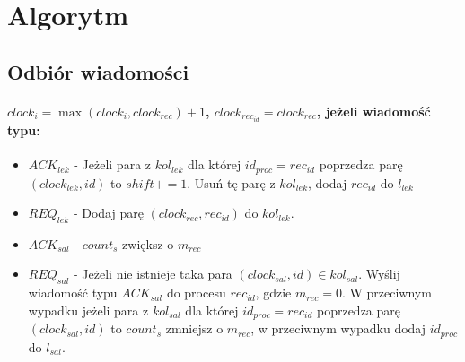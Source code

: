 \documentclass{article}
\begin{document}
\section{Algorytm}
\subsection{Odbiór wiadomości}
\paragraph{$clock_{i} = \max{(clock_i, clock_{rec})} + 1$, $clock_{rec_{id}} = clock_{rec}$, jeżeli wiadomość typu:}
\begin{itemize}
\item {$ACK_{lek}$ - Jeżeli para z $kol_{lek}$ dla której $id_{proc} = rec_{id}$ poprzedza parę $(clock_{lek}, id)$ to $shift += 1$. Usuń tę parę z $kol_{lek}$, dodaj $rec_{id}$ do $l_{lek}$}
\item {$REQ_{lek}$ - Dodaj parę $(clock_{rec}, rec_{id})$ do $kol_{lek}$}. 
\item {$ACK_{sal}$ - $count_s$ zwiększ o $m_{rec}$}
\item {$REQ_{sal}$ - Jeżeli nie istnieje taka para $(clock_{sal}, id) \in kol_{sal}$. Wyślij wiadomość typu $ACK_{sal}$ do procesu $rec_{id}$, gdzie $m_{rec} = 0$. W przeciwnym wypadku jeżeli para z $kol_{sal}$ dla której $id_{proc} = rec_{id}$ poprzedza parę $(clock_{sal}, id)$ to $count_{s}$ zmniejsz o $m_{rec}$, w przeciwnym wypadku dodaj $id_{proc}$ do $l_{sal}$.}
\end{itemize}
\end{document}
